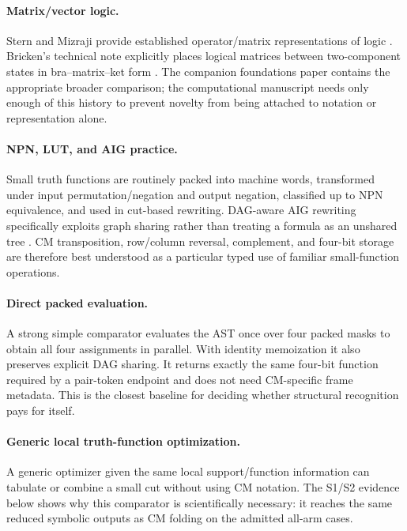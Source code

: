 \documentclass[10pt]{article}
\theoremstyle{plain}
\theoremstyle{definition}
\theoremstyle{remark}
\begin{document}
\paragraph{Matrix/vector logic.}
Stern and Mizraji provide established operator/matrix representations of logic \cite{Stern1988,Mizraji1992,Mizraji2008}. Bricken's technical note explicitly places logical matrices between two-component states in bra--matrix--ket form \cite{Bricken1997}. The companion foundations paper contains the appropriate broader comparison; the computational manuscript needs only enough of this history to prevent novelty from being attached to notation or representation alone.

\paragraph{NPN, LUT, and AIG practice.}
Small truth functions are routinely packed into machine words, transformed under input permutation/negation and output negation, classified up to NPN equivalence, and used in cut-based rewriting. DAG-aware AIG rewriting specifically exploits graph sharing rather than treating a formula as an unshared tree \cite{Mishchenko2006,Zhou2019,Testa2019}. CM transposition, row/column reversal, complement, and four-bit storage are therefore best understood as a particular typed use of familiar small-function operations.

\paragraph{Direct packed evaluation.}
A strong simple comparator evaluates the AST once over four packed masks to obtain all four assignments in parallel. With identity memoization it also preserves explicit DAG sharing. It returns exactly the same four-bit function required by a pair-token endpoint and does not need CM-specific frame metadata. This is the closest baseline for deciding whether structural recognition pays for itself.

\paragraph{Generic local truth-function optimization.}
A generic optimizer given the same local support/function information can tabulate or combine a small cut without using CM notation. The S1/S2 evidence below shows why this comparator is scientifically necessary: it reaches the same reduced symbolic outputs as CM folding on the admitted all-arm cases.
\end{document}
